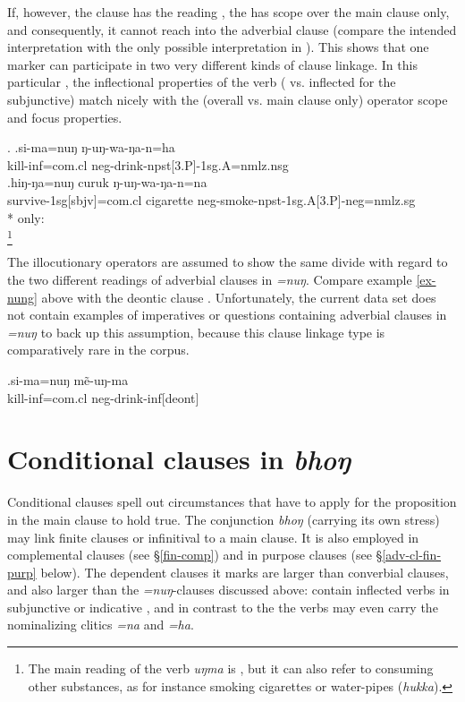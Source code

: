If, however, the clause has the reading , the  has scope over the main clause only, and consequently, it cannot reach into the adverbial clause (compare the intended interpretation with the only possible interpretation in \Next[b]). This shows that one marker can participate in two very different kinds of clause linkage. In this particular , the inflectional properties of the verb ( vs. inflected for the subjunctive) match nicely with the (overall vs. main clause only) operator scope and focus properties.

	\ex. \ag.si-ma=nuŋ ŋ-uŋ-wa-ŋa-n=ha\\
	kill{\sc -inf=com.cl} {\sc neg-}drink{-npst[3.P]-1sg.A=nmlz.nsg}\\
	\bg.hiŋ-ŋa=nuŋ curuk ŋ-uŋ-wa-ŋa-n=na\\
survive{\sc -1sg[sbjv]=com.cl} cigarette   {\sc neg-}smoke{\sc -npst-1sg.A[3.P]-neg=nmlz.sg}\\
* only:\\
\footnote{The main reading of the verb \emph{uŋma} is  , but it can also refer to consuming other substances, as for instance smoking cigarettes or water-pipes (\emph{hukka}).}

The illocutionary operators are assumed to show the same divide with regard to the two different readings of adverbial clauses in \emph{=nuŋ}. Compare example \ref{ex-nung} above with the deontic clause \Next. Unfortunately, the current data set does not contain examples of imperatives or questions containing adverbial clauses in \emph{=nuŋ} to back up this assumption, because this clause linkage type is comparatively rare in the corpus.

	\exg.si-ma=nuŋ mẽ-uŋ-ma\\
	kill{\sc -inf=com.cl} {\sc neg-}drink{\sc -inf[deont]}\\


\section{Conditional clauses in \emph{bhoŋ}}\label{adv-cl-cond}


Conditional clauses spell out circumstances that have to apply for the proposition in the main clause to hold true.  The conjunction \emph{bhoŋ} (carrying its own stress) may link finite clauses or infinitival   to a main clause. It is also employed in complemental clauses (see §\ref{fin-comp}) and in purpose clauses (see §\ref{adv-cl-fin-purp} below). The dependent clauses it marks are larger than converbial clauses, and also larger than the \emph{=nuŋ}-clauses discussed above:  contain inflected verbs in subjunctive or indicative , and in contrast to the  the verbs may even carry the nominalizing  clitics \emph{=na} and \emph{=ha}. 

